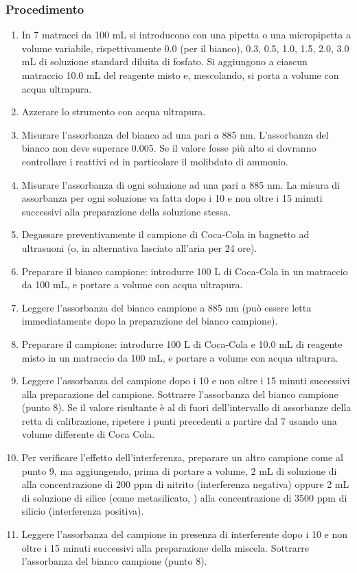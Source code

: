 \subsubsection{Procedimento}
\begin{enumerate}
\item In 7 matracci da 100 mL si introducono con una pipetta o una micropipetta a volume variabile, rispettivamente 0.0 (per il bianco), 0.3, 0.5, 1.0, 1.5, 2.0, 3.0 mL di soluzione standard diluita di fosfato. Si aggiungono a ciascun matraccio 10.0 mL del reagente misto e, mescolando, si porta a volume con acqua ultrapura.
\item Azzerare lo strumento con acqua ultrapura.
\item Misurare l'assorbanza del bianco ad una  pari a 885 nm. L'assorbanza del bianco non deve superare 0.005. Se il valore fosse più alto si dovranno controllare i reattivi ed in particolare il molibdato di ammonio.
\item Misurare l'assorbanza di ogni soluzione ad una  pari a 885 nm. La misura di assorbanza per ogni soluzione va fatta dopo i 10 e non oltre i 15 minuti successivi alla preparazione della soluzione stessa.
\item Degassare preventivamente il campione di Coca-Cola in bagnetto ad ultrasuoni (o, in alternativa lasciato all'aria per 24 ore).
\item Preparare il bianco campione: introdurre 100 \mu L di Coca-Cola in un matraccio da 100 mL, e portare a volume con acqua ultrapura.
\item Leggere l'assorbanza del bianco campione a 885 nm (può essere letta immediatamente dopo la preparazione del bianco campione).
\item Preparare il campione: introdurre 100 \mu L di Coca-Cola e 10.0 mL di reagente misto in un matraccio da 100 mL, e portare a volume con acqua ultrapura.
\item Leggere l'assorbanza del campione dopo i 10 e non oltre i 15 minuti successivi alla preparazione del campione. Sottrarre l'assorbanza del bianco campione (punto 8). Se il valore risultante è al di fuori dell'intervallo di assorbanze della retta di calibrazione, ripetere i punti precedenti a partire dal 7 usando una volume differente di Coca Cola.
\item Per verificare l'effetto dell'interferenza, preparare un altro campione come al punto 9, ma aggiungendo, prima di portare a volume, 2 mL di soluzione di  alla concentrazione di 200 ppm di nitrito (interferenza negativa) oppure 2 mL di soluzione di silice (come metasilicato, ) alla concentrazione di 3500 ppm di silicio (interferenza positiva).
\item Leggere l'assorbanza del campione in presenza di interferente dopo i 10 e non oltre i 15 minuti successivi alla preparazione della miscela. Sottrarre l'assorbanza del bianco campione (punto 8).
\end{enumerate}

